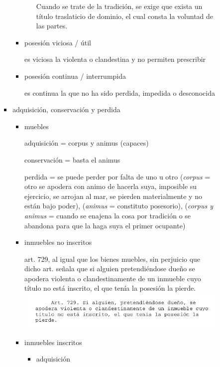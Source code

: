\documentclass[]{article}
\begin{document}
\begin{itemize}
\begin{itemize}
\begin{itemize}
\begin{itemize}
\begin{itemize}
\begin{itemize}
            Cuando se trate de la tradición, se exige que exista un
            título traslaticio de dominio, el cual consta la voluntad de
            las partes.
          \end{itemize}
        \item
          posesión viciosa / útil

          es viciosa la violenta o clandestina y no permiten prescribir
        \item
          posesión continua / interrumpida

          es continua la que no ha sido perdida, impedida o desconocida
        \end{itemize}
      \item
        adquisición, conservación y perdida

        \begin{itemize}
        \item
          muebles

          adquisición = corpus y animus (capaces)

          conservación = basta el animus

          perdida = se puede perder por falta de uno u otro
          (\emph{corpus} = otro se apodera con animo de hacerla suya,
          imposible su ejercicio, se arrojan al mar, se pierden
          materialmente y no están bajo poder), (\emph{animus} =
          constituto posesorio), (\emph{corpus y animus} = cuando se
          enajena la cosa por tradición o se abandona para que la haga
          suya el primer ocupante)
        \item
          inmuebles no inscritos

          art. 729, al igual que los bienes muebles, sin perjuicio que
          dicho art. señala que si alguien pretendiéndose dueño se
          apodera violenta o clandestinamente de un inmueble cuyo título
          no está inscrito, el que tenía la posesión la pierde.
          \includegraphics{729.png}
        \item
          inmuebles inscritos

          \begin{itemize}
          \item
            adquisición


\end{itemize}
\end{itemize}
\end{itemize}
\end{itemize}
\end{itemize}
\end{itemize}
\end{document}
